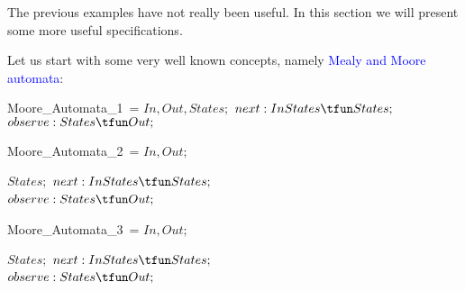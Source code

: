 \documentclass[landscape, autoslides, light]{mmiss}
\begin{document}
\begin{Package}[Label={FSDPT}, Title={Formal Specification of Data and Process Types}, ShortTitle={FSDPT}, Authors={Horst Reichel}, Date={February 2003}, LevelOfDetail=Lecture, Language=en-GB]
\begin{Section}[Title={Final Coalgebras as Process Types}, Label={section4}]
\begin{Section}[Title={Final Constraints}, Label={section4_1}]
\begin{Paragraph}[Label=Paragraph92]
\end{Paragraph}
\end{Section}
\begin{Section}[Title={Examples of Process Types}, Label={section4_2}]
\begin{Paragraph}

The previous examples have not really been useful. In this section
we will present some more useful specifications.\pause

Let us start with some very well known concepts, namely
\textcolor{blue}{Mealy and Moore automata}:\pause



\begin{SpecDefn}{Moore\_Automata\_1}~=
 \I\Sort \( In, Out, States; \)
 \I\Ops \( next : In\* States \tfun States;\) \\ \(observe : States \tfun Out; \)
 \item[\End]
\end{SpecDefn}



\end{Paragraph}
\begin{Paragraph}[Title={Moore--Automata}, Label=Paragraph93]

\begin{SpecDefn}{Moore\_Automata\_2}~=
\I\Sort \( In, Out; \) \item[\Then] \item[\Cogenerated~\Group]
\begin{Items}
\I\Sort \( States; \) \I\Ops \( next : In \* States \tfun
States;\) \\ \(observe : States \tfun Out; \)
 ~\EndGroup \end{Items}  \item[\End]
\end{SpecDefn}

\end{Paragraph}
\begin{Paragraph}[Title={Moore--Automata}, Label=Paragraph94]

\begin{SpecDefn}{Moore\_Automata\_3}~=
\I\Sort \( In, Out; \) \item[\Then] \item[\Cofree~\Group]
\begin{Items}
\I\Sort \( States; \) \I\Ops \( next : In \* States \tfun
States;\) \\ \(observe : States \tfun Out; \)
 ~\EndGroup \end{Items}  \item[\End]
\end{SpecDefn}


\end{Paragraph}
\end{Section}
\end{Section}
\end{Package}
\end{document}
